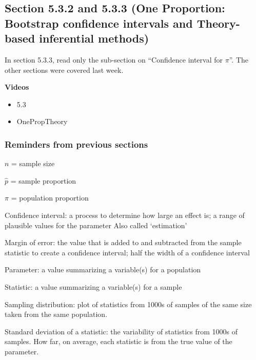 \documentclass[
]{report}
\providecommand{\tightlist}{%
  \setlength{\itemsep}{0pt}\setlength{\parskip}{0pt}}
\newcommand{\rgi}{\hspace{24pt}}  %
\begin{document}
\hypertarget{section-5.3.2-and-5.3.3-one-proportion-bootstrap-confidence-intervals-and-theory-based-inferential-methods}{%
\subsection{Section 5.3.2 and 5.3.3 (One Proportion: Bootstrap confidence intervals and Theory-based inferential methods)}\label{section-5.3.2-and-5.3.3-one-proportion-bootstrap-confidence-intervals-and-theory-based-inferential-methods}}


In section 5.3.3, read only the sub-section on ``Confidence interval for \(\pi\)''. The other sections were covered last week.

\textbf{Videos}

\begin{itemize}
\tightlist
\item
  5.3
\item
  OnePropTheory
\end{itemize}


\hypertarget{reminders-from-previous-sections-1}{%
\subsubsection*{Reminders from previous sections}\label{reminders-from-previous-sections-1}}

\(n\) = sample size

\(\hat{p}\) = sample proportion

\(\pi\) = population proportion

Confidence interval: a process to determine how large an effect is; a range of plausible values for the parameter
Also called `estimation'

\rgi Margin of error: the value that is added to and subtracted from the sample statistic to create a confidence interval; half the width of a confidence interval

Parameter: a value summarizing a variable(s) for a population

Statistic: a value summarizing a variable(s) for a sample

Sampling distribution: plot of statistics from 1000s of samples of the same size taken from the same population.

Standard deviation of a statistic: the variability of statistics from 1000s of samples. How far, on average, each statistic is from the true value of the parameter.
\end{document}
